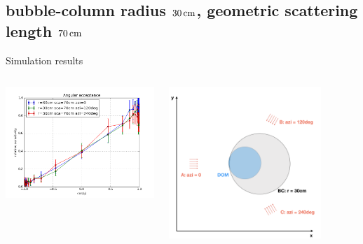 \subsection{bubble-column radius $30\text{\,cm}$, geometric scattering length $70\text{\,cm}$}
\begin{frame}[fragile]{Simulation results}
  \begin{columns}
    \begin{column}{0.5\textwidth}
      \includegraphics[width=\textwidth]{img/summer_scenario_r30cm_sca70cm}
    \end{column}
    \begin{column}{0.5\textwidth}
      \includegraphics[width=0.8\textwidth]{img/summerscenario-005}
    \end{column}
  \end{columns}


\end{frame}
